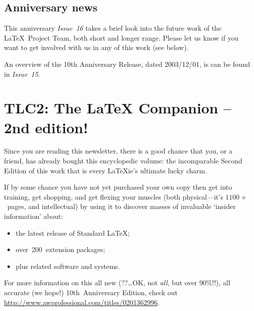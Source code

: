 \documentclass{ltnews}
\begin{document}
\maketitle


\subsection{Anniversary news}

This anniversary \textit{Issue~16} takes a brief look into the future work of
the \LaTeX\ Project Team, both short and longer range.  Please let
us know if you want %
to get involved with us in any of this work (see below).

An overview of the 10th Anniversary Release, dated 2003/12/01, is
can be found in \textit{Issue~15}.


\section{TLC2: The \LaTeX{} Companion -- 2nd edition!}

Since you are reading this newsletter, there is a good chance that
you, or a friend, has already bought this encyclopedic volume: the
incomparable Second\newline
Edition of this work that is every \LaTeX{}ie's\newline
ultimate lucky charm.

If by some chance you have not yet purchased your own copy then get
into training, get shopping, and get flexing your muscles (both
physical---it's $1100+$~pages,\newline
and intellectual) by using it to discover
masses of invaluable `insider information' about:
\begin{itemize}
\item the latest release of Standard \LaTeX{};
\item over~200~extension packages;
\item plus related software and systems.
\end{itemize}
For more information on this all new (??\ldots OK,\newline
not \emph{all}, but over 90\%!!),
all accurate (we hope!)\newline
10th~Anniversary Edition, check out\newline
 \mbox{\url{http://www.awprofessional.com/titles/0201362996}}.
\end{document}
